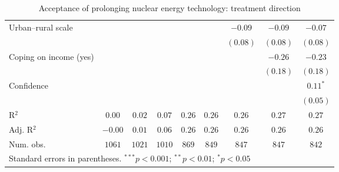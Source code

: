 \begin{table}[h]
\begin{center}
\begin{tabular}{l c c c c c c c c}
Urban–rural scale                                                               &              &               &               &               &               & $-0.09$       & $-0.09$       & $-0.07$       \\
                                                                                &              &               &               &               &               & $(0.08)$      & $(0.08)$      & $(0.08)$      \\
Coping on income (yes)                                                          &              &               &               &               &               &               & $-0.26$       & $-0.23$       \\
                                                                                &              &               &               &               &               &               & $(0.18)$      & $(0.18)$      \\
Confidence                                                                      &              &               &               &               &               &               &               & $0.11^{*}$    \\
                                                                                &              &               &               &               &               &               &               & $(0.05)$      \\
\hline
R$^2$                                                                           & $0.00$       & $0.02$        & $0.07$        & $0.26$        & $0.26$        & $0.26$        & $0.27$        & $0.27$        \\
Adj. R$^2$                                                                      & $-0.00$      & $0.01$        & $0.06$        & $0.26$        & $0.26$        & $0.26$        & $0.26$        & $0.26$        \\
Num. obs.                                                                       & $1061$       & $1021$        & $1010$        & $869$         & $849$         & $847$         & $847$         & $842$         \\
\hline
\multicolumn{9}{l}{\scriptsize{Standard errors in parentheses. $^{***}p<0.001$; $^{**}p<0.01$; $^{*}p<0.05$}}
\end{tabular}
\caption{Acceptance of prolonging nuclear energy technology: treatment direction}
\label{table:acceptance_prolong_nucs_treatment_direction}
\end{center}
\end{table}

